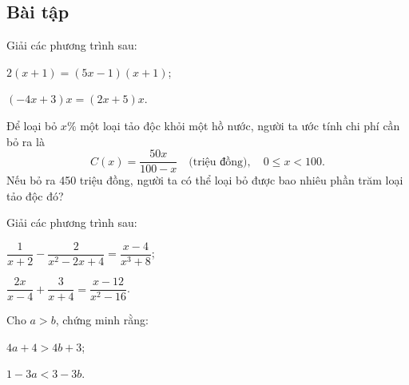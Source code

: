 \begin{exercises}
    \subsection{Bài tập}

    \begin{questions}[resume=SGK]
        \item Giải các phương trình sau:
        \begin{questions}
            \item $2(x+1)=(5x-1)(x+1)$;

            \answerline
            \answerline
            \item $(-4x+3)x=(2x+5)x$.

            \answerline
            \answerline
        \end{questions}

        \item Để loại bỏ $x\%$ một loại tảo độc khỏi một hồ nước, người ta ước tính chi phí cần bỏ ra là
        \[
            C(x)=\dfrac{50x}{100-x}\quad\text{(triệu đồng)},\quad 0\le x<100.
        \]
        Nếu bỏ ra 450 triệu đồng, người ta có thể loại bỏ được bao nhiêu phần trăm loại tảo độc đó?

        \answerline
        \answerline
        \answerline

        \item Giải các phương trình sau:
        \begin{questions}
            \item $\dfrac{1}{x+2}-\dfrac{2}{x^2-2x+4}=\dfrac{x-4}{x^3+8}$;

            \answerline
            \answerline
            \answerline
            \item $\dfrac{2x}{x-4}+\dfrac{3}{x+4}=\dfrac{x-12}{x^2-16}$.

            \answerline
            \answerline
            \answerline
        \end{questions}

        \item Cho $a>b$, chứng minh rằng:
        \begin{questions}
            \item $4a+4>4b+3$;

            \answerline
            \answerline
            \item $1-3a<3-3b$.

            \answerline
            \answerline
        \end{questions}
    \end{questions}
\end{exercises}
